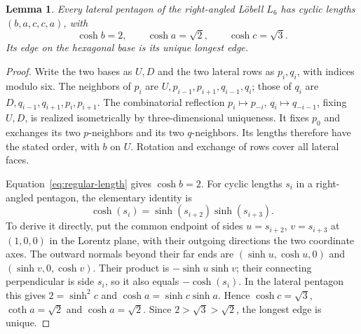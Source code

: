 \documentclass[11pt]{article}
\newtheorem{lemma}[theorem]{Lemma}
\theoremstyle{remark}
\begin{document}
\begin{lemma}\label{lem:loebell-six}
Every lateral pentagon of the right-angled L\"obell $L_6$ has cyclic
lengths $(b,a,c,c,a)$, with
\[
 \cosh b=2,\qquad \cosh a=\sqrt2,\qquad \cosh c=\sqrt3.
\]
Its edge on the hexagonal base is its unique longest edge.
\end{lemma}
\begin{proof}
Write the two bases as $U,D$ and the two lateral rows as $p_i,q_i$,
with indices modulo six. The neighbors of $p_i$ are
$U,p_{i-1},p_{i+1},q_{i-1},q_i$; those of $q_i$ are
$D,q_{i-1},q_{i+1},p_i,p_{i+1}$. The combinatorial reflection
$p_i\mapsto p_{-i}$, $q_i\mapsto q_{-i-1}$, fixing $U,D$,
is realized isometrically by three-dimensional uniqueness. It fixes
$p_0$ and exchanges its two $p$-neighbors and its two $q$-neighbors.
Its lengths therefore have the stated order, with $b$ on $U$.
Rotation and exchange of rows cover all lateral faces.

Equation~\eqref{eq:regular-length} gives $\cosh b=2$. For cyclic
lengths $s_i$ in a right-angled pentagon, the elementary identity is
\[
 \cosh(s_i)=\sinh(s_{i+2})\sinh(s_{i+3}).
\]
To derive it directly, put the common endpoint of sides $u=s_{i+2}$,
$v=s_{i+3}$ at $(1,0,0)$ in the Lorentz plane, with their outgoing
directions the two coordinate axes. The outward normals beyond their
far ends are $(\sinh u,\cosh u,0)$ and
$(\sinh v,0,\cosh v)$. Their product is $-\sinh u\sinh v$;
their connecting perpendicular is side $s_i$, so it also equals
$-\cosh(s_i)$. In the lateral pentagon this gives
$2=\sinh^2c$ and $\cosh a=\sinh c\sinh a$.
Hence $\cosh c=\sqrt3$, $\coth a=\sqrt2$ and $\cosh a=\sqrt2$.
Since $2>\sqrt3>\sqrt2$, the longest edge is unique.
\end{proof}
\end{document}
